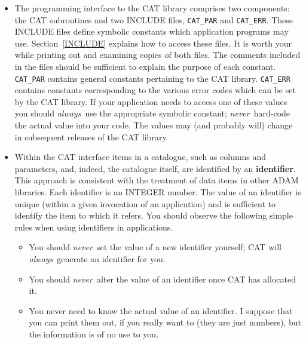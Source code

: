 \documentclass[11pt,twoside]{starlink}
\begin{document}
\begin{itemize}

  \item The programming interface to the CAT library comprises two
   components: the CAT subroutines and two INCLUDE files, \texttt{CAT\_PAR}
   and \texttt{CAT\_ERR}. These INCLUDE files define symbolic constants
   which application programs may use. Section~\ref{INCLUDE} explains
   how to access these files. It is worth your while printing out and
   examining copies of both files. The comments included in the files
   should be sufficient to explain the purpose of each constant. \texttt{CAT\_PAR} contains general constants pertaining to the CAT library.
   \texttt{CAT\_ERR} contains constants corresponding to the various error
   codes which can be set by the CAT library. If your application needs
   to access one of these values you should \textit{always}\, use the
   appropriate symbolic constant; \textit{never}\, hard-code the actual
   value into your code. The values may (and probably will) change in
   subsequent releases of the CAT library.

  \item Within the CAT interface items in a catalogue, such as columns
   and parameters, and, indeed, the catalogue itself, are identified
   by an \textbf{identifier}. This approach is consistent with the
   treatment of data items in other ADAM libraries. Each identifier is
   an INTEGER number. The value of an identifier is unique (within a
   given invocation of an application) and is sufficient to identify
   the item to which it refers. You should observe the following simple
   rules when using identifiers in applications.

  \begin{itemize}

    \item You should \textit{never}\, set the value of a new identifier
     yourself; CAT will \textit{always}\, generate an identifier for you.

    \item You should \textit{never}\, alter the value of an identifier
     once CAT has allocated it.

    \item You never need to know the actual value of an identifier. I
     suppose that you can print them out, if you really want to (they
     are just numbers), but the information is of no use to you.

  \end{itemize}


\end{itemize}
\end{document}
